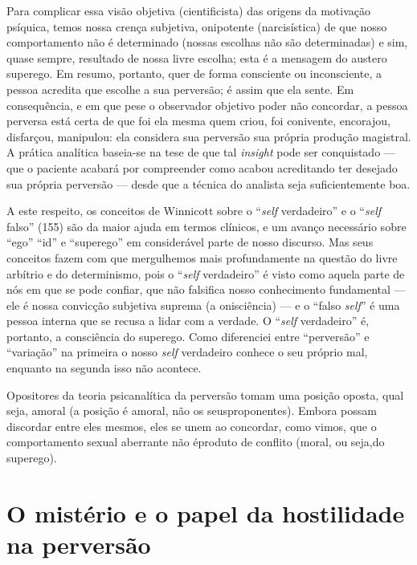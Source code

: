 Para complicar essa visão objetiva (cientificista) das origens da
motivação psíquica, temos nossa crença subjetiva, onipotente
(narcisística) de que nosso comportamento não é determinado (nossas
escolhas não são determinadas) e sim, quase sempre, resultado de nossa
livre escolha; esta é a mensagem do austero superego. Em resumo,
portanto, quer de forma consciente ou inconsciente, a pessoa acredita
que escolhe a sua perversão; é assim que ela sente. Em consequência, e
em que pese o observador objetivo poder não concordar, a pessoa
perversa está certa de que foi ela mesma quem criou, foi conivente,
encorajou, disfarçou, manipulou: ela considera sua perversão sua
própria produção magistral. A prática analítica baseia-se na tese de
que tal \textit{insight} pode ser conquistado --- que o paciente
acabará por compreender como acabou acreditando ter desejado sua
própria perversão --- desde que a técnica do analista seja
suficientemente boa.

A este respeito, os conceitos de\idxwinni{} Winnicott\idxself{} sobre o
``\textit{self} verdadeiro'' e o
``\textit{self} falso'' (155) são da maior
ajuda em termos clínicos, e um avanço necessário sobre
``ego'' ``id'' e ``superego'' em considerável parte de nosso
discurso. Mas seus conceitos fazem com que mergulhemos mais
profundamente na questão do livre arbítrio e do determinismo, pois o
``\textit{self} verdadeiro'' é visto como
aquela parte de nós em que se pode confiar, que não falsifica nosso
conhecimento fundamental --- ele é nossa convicção subjetiva suprema
(a onisciência) --- e o ``falso \textit{self}'' é uma pessoa interna que se recusa a lidar
com a verdade. O ``\textit{self} verdadeiro''
é, portanto, a consciência do superego. Como diferenciei entre
``perversão'' e
``variação'' na primeira o nosso \textit{self} verdadeiro conhece
o seu próprio mal, enquanto na segunda isso não acontece.

Opositores da teoria psicanalítica da perversão tomam uma posição
oposta, qual seja, amoral (a posição é amoral, não os seus\idxlivre[|)]
proponentes). Embora possam discordar entre eles mesmos, eles se unem
ao concordar, como vimos, que o comportamento sexual aberrante não é\idxpervrespo[|)]
produto de conflito (moral, ou seja,\idxrespo[|)] do superego).


\section{O mistério e o papel da hostilidade na perversão}


